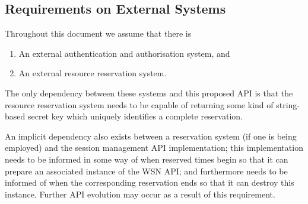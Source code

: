 		\subsection{Requirements on External Systems}
Throughout this document we assume that there is 
\begin{enumerate}
	\item An external authentication and authorisation system, and 
	\item An external resource reservation system.
\end{enumerate}

The only dependency between these systems and this proposed API is that the resource reservation system needs to be capable of returning some kind of string-based secret key which uniquely identifies a complete reservation.

An implicit dependency also exists between a reservation system (if one is being employed) and the session management API implementation; this implementation needs to be informed in some way of when reserved times begin so that it can prepare an associated instance of the WSN API; and furthermore needs to be informed of when the corresponding reservation ends so that it can destroy this instance. Further API evolution may occur as a result of this requirement.